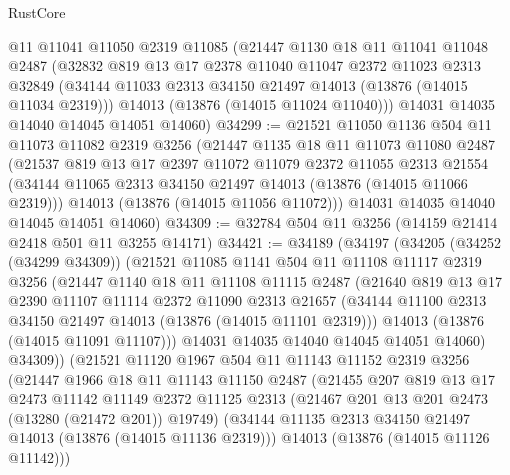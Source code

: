 \begin{lexlean}{RustCore}
\begin{coremodule}
    @11
    @11041
    @11050
    @2319
    @11085
    (@21447
      @1130
      @18
      @11
      @11041
      @11048
      @2487
      (@32832
        @819
        @13
        @17
        @2378
        @11040
        @11047
        @2372
        @11023
        @2313
        @32849
        (@34144 @11033 @2313 @34150 @21497 @14013 (@13876 (@14015 @11034 @2319)))
        @14013
        (@13876 (@14015 @11024 @11040)))
      @14031
      @14035
      @14040
      @14045
      @14051
      @14060)
@34299 := @21521
    @11050
    @1136
    @504
    @11
    @11073
    @11082
    @2319
    @3256
    (@21447
      @1135
      @18
      @11
      @11073
      @11080
      @2487
      (@21537
        @819
        @13
        @17
        @2397
        @11072
        @11079
        @2372
        @11055
        @2313
        @21554
        (@34144 @11065 @2313 @34150 @21497 @14013 (@13876 (@14015 @11066 @2319)))
        @14013
        (@13876 (@14015 @11056 @11072)))
      @14031
      @14035
      @14040
      @14045
      @14051
      @14060)
@34309 := @32784 @504 @11 @3256 (@14159 @21414 @2418 @501 @11 @3255 @14171)
@34421 := @34189
    (@34197
      (@34205
        (@34252 (@34299 @34309))
        (@21521
          @11085
          @1141
          @504
          @11
          @11108
          @11117
          @2319
          @3256
          (@21447
            @1140
            @18
            @11
            @11108
            @11115
            @2487
            (@21640
              @819
              @13
              @17
              @2390
              @11107
              @11114
              @2372
              @11090
              @2313
              @21657
              (@34144 @11100 @2313 @34150 @21497 @14013 (@13876 (@14015 @11101 @2319)))
              @14013
              (@13876 (@14015 @11091 @11107)))
            @14031
            @14035
            @14040
            @14045
            @14051
            @14060)
          @34309))
      (@21521
        @11120
        @1967
        @504
        @11
        @11143
        @11152
        @2319
        @3256
        (@21447
          @1966
          @18
          @11
          @11143
          @11150
          @2487
          (@21455
            @207
            @819
            @13
            @17
            @2473
            @11142
            @11149
            @2372
            @11125
            @2313
            (@21467 @201 @13 @201 @2473 (@13280 (@21472 @201)) @19749)
            (@34144 @11135 @2313 @34150 @21497 @14013 (@13876 (@14015 @11136 @2319)))
            @14013
            (@13876 (@14015 @11126 @11142)))

\end{coremodule}
\end{lexlean}
